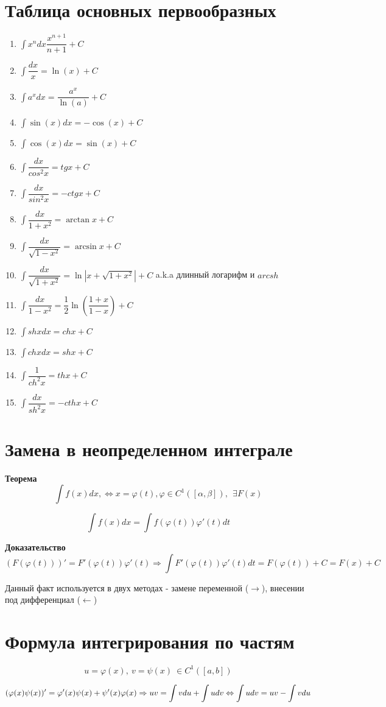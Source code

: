 \documentclass[a4paper,11pt]{article}
\renewcommand{\phi}{\ensuremath{\varphi}}
\newcommand{\formula}[1]{
\begin{myquote} 
	\centering
	\begin{equation}
	{#1}
	\end{equation}
\end{myquote}
 }
\begin{document}
\section{Таблица основных первообразных}

\begin{enumerate}
	\item $\int x^n dx \dfrac{x^{n+1}}{n+1} + C$
	\item $ \int \dfrac{dx}{x} = \ln (x) + C$
	\item $\int a^x dx = \dfrac{a^x}{\ln(a)} + C$
	\item $\int \sin(x)dx = - \cos (x) + C$
	\item $\int \cos(x)dx = \sin(x) + C$
	\item $\int \dfrac{dx}{cos^2x} = tgx + C$
	\item $\int \dfrac{dx}{sin^2x} = -ctgx + C$
	\item $\int \dfrac{dx}{1+x^2} = \arctan x + C$
	\item $ \int \dfrac{dx}{\sqrt{1-x^2}} = \arcsin x + C$ 
	\item $ \int \dfrac{dx}{\sqrt{1 + x^2}} = \ln |x + \sqrt{1+x^2}| + C$ a.k.a длинный логарифм и $arcsh$	
	\item $ \int \dfrac{dx}{1-x^2} = \dfrac{1}{2} \ln \left( \dfrac{1 + x}{1 - x } \right) + C$
	\item $\int shxdx = chx + C$
	\item $\int chxdx = shx + C$
	\item $\int \dfrac{1}{ch^2x} = thx + C$
	\item $\int \dfrac{dx}{sh^2x} = -cthx + C$

	
\end{enumerate}
\section{Замена в неопределенном интеграле}
\textbf{Теорема}
\[
\int f(x)dx, \Leftrightarrow x = \phi (t), \phi \in C^1([\alpha, \beta]), \ \ \exists F(x)
\]
\formula{
\int f(x)dx = \int f(\phi (t)) \phi '(t)dt
}
\textbf{Доказательство}
\[
(F(\phi(t)))'=F'(\phi(t))\phi'(t) \Rightarrow \int F'(\phi(t))\phi'(t)dt = F(\phi(t)) + C = F(x) + C
\]

Данный факт используется в двух методах - замене переменной ($\rightarrow$), внесении под дифференциал ($\leftarrow$)

\section{Формула интегрирования по частям}
\[
u = \phi(x), \ v = \psi(x) \ \in C^1([a, b])
\]
\formula{\label{eq:partint}
(\phi(x) \psi(x))'= \phi'(x) \psi(x) + \psi'(x) \phi(x) \Rightarrow uv = \int v du + \int udv \Leftrightarrow \int udv = uv - \int vdu}
\end{document}
